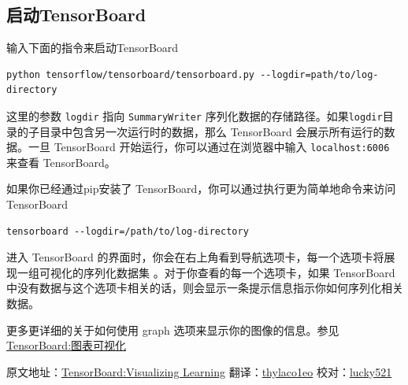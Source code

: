 \subsection{启动TensorBoard　}\label{ux542fux52a8tensorboard}

输入下面的指令来启动TensorBoard

\begin{verbatim}
python tensorflow/tensorboard/tensorboard.py --logdir=path/to/log-directory
\end{verbatim}

这里的参数 \texttt{logdir} 指向 \texttt{SummaryWriter}
序列化数据的存储路径。如果\texttt{logdir}目录的子目录中包含另一次运行时的数据，那么
TensorBoard 会展示所有运行的数据。一旦 TensorBoard
开始运行，你可以通过在浏览器中输入 \texttt{localhost:6006} 来查看
TensorBoard。

如果你已经通过pip安装了 TensorBoard，你可以通过执行更为简单地命令来访问
TensorBoard

\begin{verbatim}
tensorboard --logdir=/path/to/log-directory
\end{verbatim}

进入 TensorBoard
的界面时，你会在右上角看到导航选项卡，每一个选项卡将展现一组可视化的序列化数据集
。对于你查看的每一个选项卡，如果 TensorBoard
中没有数据与这个选项卡相关的话，则会显示一条提示信息指示你如何序列化相关数据。

更多更详细的关于如何使用 graph 选项来显示你的图像的信息。参见
\href{./graph_viz.md}{TensorBoard:图表可视化}

原文地址：\href{http://tensorflow.org/how_tos/summaries_and_tensorboard/index.html\#tensorboard-visualizing-learning}{TensorBoard:Visualizing
Learning} 翻译：\href{https://github.com/thylaco1eo}{thylaco1eo}
校对：\href{https://github.com/lucky521}{lucky521}

